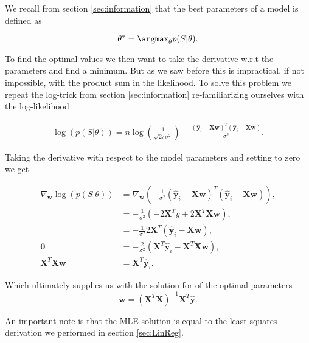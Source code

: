 \noindent We recall from section \ref{sec:information} that the best parameters of a model is defined as 

\begin{equation}
\mathbf{\theta}^* = \argmax_\mathbf{\theta} p(S|\mathbf{\theta}).
\end{equation}

\noindent To find the optimal values we then want to take the derivative w.r.t the parameters and find a minimum. But as we saw before this is impractical, if not impossible, with the product sum in the likelihood. To solve this problem we repeat the log-trick from section \ref{sec:information} re-familiarizing ourselves with the log-likelihood

\begin{align}
\log(p(S|\theta)) = n \log(\frac{1}{\sqrt{2\pi \sigma^2}}) - \frac{(\mathbf{\hat{y}}_i - \mathbf{X}\mathbf{w})^T(\mathbf{\hat{y}}_i - \mathbf{X}\mathbf{w})}{\sigma^2}.
\end{align}

\noindent Taking the derivative with respect to the model parameters and setting to zero we get

\begin{align*}
\nabla_\mathbf{w} \log(p(S|\theta)) &=\nabla_\mathbf{w}\left( - \frac{1}{\sigma^2} (\mathbf{\hat{y}}_i - \mathbf{X}\mathbf{w})^T(\mathbf{\hat{y}}_i - \mathbf{X}\mathbf{w}) \right),\\
&=  - \frac{1}{\sigma^2}(-2\mathbf{X}^Ty + 2\mathbf{X}^T\mathbf{X}\mathbf{w}),\\
&= -\frac{1}{\sigma^2} 2 \mathbf{X}^T(\mathbf{\hat{y}}_i- \mathbf{X}\mathbf{w}), \\
\mathbf{0} & = -\frac{2}{\sigma^2}(\mathbf{X}^T\mathbf{\hat{y}}_i - \mathbf{X}^T\mathbf{Xw}), \\
\mathbf{X}^T\mathbf{Xw} &= \mathbf{X}^T\mathbf{\hat{y}}_i .
\end{align*}

\noindent Which ultimately supplies us with the solution for of the optimal parameters 
\begin{equation}\label{eq:ls}
\mathbf{w}= (\mathbf{X}^T \mathbf{X})^{-1}\mathbf{X}^T\mathbf{\hat{y}}.
\end{equation}


\noindent An important note is that the MLE solution is equal to the least squares derivation we performed in section \ref{sec:LinReg}. 